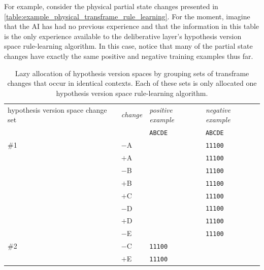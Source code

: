 For example, consider the physical partial state changes presented in
{\mbox{\autoref{table:example_physical_transframe_rule_learning}}}.
For the moment, imagine that the AI has had no previous experience and
that the information in this table is the only experience available to
the deliberative layer's hypothesis version space rule-learning
algorithm.  In this case, notice that many of the partial state
changes have exactly the same positive and negative training examples
thus far.
\begin{table}
\centering
\begin{tabular}{p{2cm}|p{1cm}|p{1.5cm}|p{1.5cm}|}
hypothesis version space change set & {\emph{change}}        & {\emph{positive example}}      & {\emph{negative example}}      \\
                                    &                        & {\tt{ABCDE}}                   & {\tt{ABCDE}}                   \\
\hline
\#1                                 & $-$A                   &                                & {\tt{11100}}                   \\
                                    & $+$A                   &                                & {\tt{11100}}                   \\
                                    & $-$B                   &                                & {\tt{11100}}                   \\
                                    & $+$B                   &                                & {\tt{11100}}                   \\
                                    & $+$C                   &                                & {\tt{11100}}                   \\
                                    & $-$D                   &                                & {\tt{11100}}                   \\
                                    & $+$D                   &                                & {\tt{11100}}                   \\
                                    & $-$E                   &                                & {\tt{11100}}                   \\
\hline
\#2                                 & $-$C                   & {\tt{11100}}                   &                                \\
                                    & $+$E                   & {\tt{11100}}                   &                                \\
\hline
\end{tabular}
\caption[Lazy allocation of hypothesis version spaces by grouping sets
  of transframe changes that occur in identical contexts.]{Lazy
  allocation of hypothesis version spaces by grouping sets of
  transframe changes that occur in identical contexts.  Each of these
  sets is only allocated one hypothesis version space rule-learning
  algorithm.}
\label{table:example_lazy_hypothesis_space_allocation}
\end{table}
